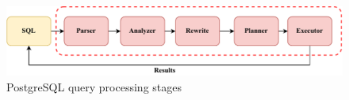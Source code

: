 \begin{figure}[hbt!]
\centering
\includegraphics[width=1.0\linewidth]{img/pg-query-processing-stage.pdf}
\caption[PostgreSQL query processing stages]{PostgreSQL query processing stages 
\cite{huang_comprehensive_2024}}
\label{fig:pg-query-processing-stages}
\end{figure}